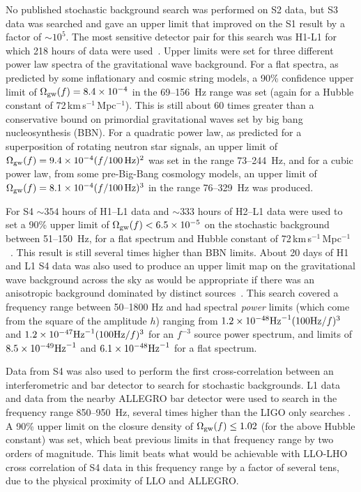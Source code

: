\documentclass{article}
\begin{document}
No published stochastic background search was performed on S2 data, but S3 data
was searched and gave an upper limit that improved on the S1 result by a factor
of $\sim10^5$. The most sensitive detector pair for this search was H1-L1 for
which 218 hours of data were used~\cite{Abbott:2005h}. Upper limits were set for
three different power law spectra of the gravitational wave background. For a
flat spectra, as predicted by some inflationary and cosmic string models, a 90\%
confidence upper limit of $\Omega_{\rm gw}(f) = 8.4\times10^{-4}$ in the
69--156~Hz range was set (again for a Hubble constant of
72\,km\,s$^{-1}$\,Mpc$^{-1}$). This is still about 60 times greater than a
conservative bound on primordial gravitational waves set by big bang
nucleosynthesis (BBN). For a quadratic power law, as predicted for a
superposition of rotating neutron star signals, an upper limit of $\Omega_{\rm
gw}(f) = 9.4\times10^{-4}(f/100\,{\rm Hz})^2$ was set in the range 73--244~Hz,
and for a cubic power law, from some pre-Big-Bang cosmology models, an upper
limit of $\Omega_{\rm gw}(f) = 8.1\times10^{-4}(f/100\,{\rm Hz})^3$ in the range
76--329~Hz was produced.

For S4 $\sim354$ hours of H1--L1 data and $\sim333$ hours of H2--L1 data were
used to set a 90\% upper limit of $\Omega_{\rm gw}(f) < 6.5\times10^{-5}$ on
the stochastic background between 51--150~Hz, for a flat spectrum and Hubble
constant of 72\,km\,s$^{-1}$\,Mpc$^{-1}$~\cite{Abbott:2007e}. This result is
still several times higher than BBN limits. About 20 days of H1 and L1 S4 data
was also used to produce an upper limit map on the gravitational wave background
across the sky as would be appropriate if there was an anisotropic background
dominated by distinct sources~\cite{Abbott:2007f}. This search covered a
frequency range between 50--1800 Hz and had spectral \textit{power} limits (which
come from the square of the amplitude $h$) ranging from $1.2\times10^{-48} {\rm
Hz}^{-1} (100 {\rm Hz}/f)^3$ and $1.2\times10^{-47}{\rm Hz}^{-1} (100 {\rm
Hz}/f)^3$ for an $f^{-3}$ source power spectrum, and limits of
$8.5\times10^{-49} {\rm Hz}^{-1}$ and $6.1\times10^{-48} {\rm
Hz}^{-1}$ for a flat spectrum.

Data from S4 was also used to perform the first cross-correlation between an
interferometric and bar detector to search for stochastic backgrounds. L1 data
and data from the nearby ALLEGRO bar detector were used to search in the
frequency range 850--950~Hz, several times higher than the LIGO only searches
\cite{Abbott:2007g}. A 90\% upper limit on the closure density of $\Omega_{\rm
gw}(f) \leq 1.02$ (for the above Hubble constant) was set, which beat previous
limits in that frequency range by two orders of magnitude. This limit beats what
would be achievable with LLO-LHO cross correlation of S4 data in this frequency
range by a factor of several tens, due to the physical proximity of LLO and
ALLEGRO.
\end{document}
